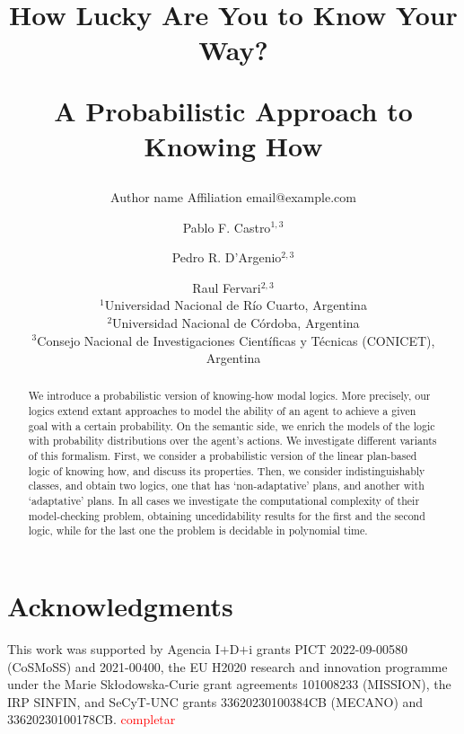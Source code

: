 \documentclass{article}
\title{How Lucky Are You to Know Your Way?\par A Probabilistic Approach to Knowing How} %
\author{%
    Author name
    \affiliations
    Affiliation
    \emails
    email@example.com    %
}
\author{%
Pablo F. Castro$^{1,3}$\and
Pedro R. D'Argenio$^{2,3}$\and
Raul Fervari$^{2,3}$ \\
\affiliations
$^1$Universidad Nacional de R\'io Cuarto, Argentina\\
$^2$Universidad Nacional de C\'ordoba, Argentina\\
$^3$Consejo Nacional de Investigaciones Cient\'ificas y T\'ecnicas (CONICET), Argentina\\
}
\begin{document}
\maketitle

\begin{abstract}
  We introduce a probabilistic version of knowing-how modal logics.  More precisely,  our logics extend extant approaches to model the ability of an agent to achieve a given goal with a certain probability.  On the semantic side,  we enrich the models of the logic with probability distributions over the agent's actions.  We investigate different variants of this formalism.  First,  we consider a probabilistic version of the linear plan-based logic of knowing how, and discuss its properties. Then, we consider indistinguishably classes,  and obtain two logics,  one that has `non-adaptative' plans, and another  with `adaptative' plans. In all cases we investigate the computational complexity of their model-checking problem, obtaining uncedidability results for the first and the second logic, while for the last one the problem is decidable in polynomial time.  
\end{abstract}







\section*{Acknowledgments}

This work was supported by Agencia I$+$D$+$i grants PICT 2022-09-00580
({\scriptsize CoSMoSS}) and 
2021-00400,
%
the EU H2020 research and innovation programme
under the Marie Sk{\l}odowska-Curie grant agreements 101008233
({\scriptsize MISSION}),
%
the IRP SINFIN, 
%
and SeCyT-UNC grants 33620230100384CB ({\scriptsize MECANO}) and 33620230100178CB.
%
\textcolor{red}{completar}










\newpage
\appendix


\end{document}
